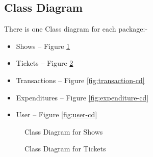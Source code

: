 \documentclass{scrreprt}
\begin{document}
\subsection{Class Diagram}
There is one Class diagram for each package:-
\begin{itemize}
	\item Shows -- Figure \ref{fig:show-cd}
	\item Tickets -- Figure \ref{fig:ticket-cd}
	\item Transactions -- Figure \ref{fig:transaction-cd}
	\item Expenditures -- Figure \ref{fig:expenditure-cd}
	\item User -- Figure \ref{fig:user-cd}
\end{itemize}
\begin{figure}
	\centering
	\caption{Class Diagram for Shows}
	\label{fig:show-cd}
\end{figure}
\begin{figure}
	\centering
	\caption{Class Diagram for Tickets}
	\label{fig:ticket-cd}
\end{figure}
\end{document}
